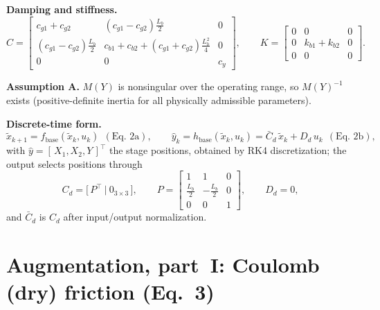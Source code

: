 \documentclass[11pt]{article}
\newcommand{\xb}{\tilde{x}}
\newcommand{\yh}{\hat{y}}
\newcommand{\Cbar}{\bar{C}_d}
\newcommand{\fb}{f_{\mathrm{base}}}
\newcommand{\hb}{h_{\mathrm{base}}}
\begin{document}
\medskip\noindent\textbf{Damping and stiffness.}
\begin{equation}
  C =
  \begin{bmatrix}
    c_{g1}{+}c_{g2}             & (c_{g1}{-}c_{g2})\tfrac{L_b}{2}                    & 0 \\[2mm]
    (c_{g1}{-}c_{g2})\tfrac{L_b}{2} & c_{b1}{+}c_{b2}{+}(c_{g1}{+}c_{g2})\tfrac{L_b^2}{4} & 0 \\[2mm]
    0                          & 0                                                  & c_y
  \end{bmatrix},
  \qquad
  K =
  \begin{bmatrix}
    0 & 0            & 0 \\[2mm]
    0 & k_{b1}{+}k_{b2} & 0 \\[2mm]
    0 & 0            & 0
  \end{bmatrix}.
  \label{eq:baseline-CK}
\end{equation}

\medskip\noindent\textbf{Assumption A.}\quad
$M(Y)$ is nonsingular over the operating range, so $M(Y)^{-1}$ exists (positive-definite
inertia for all physically admissible parameters).

\medskip\noindent\textbf{Discrete-time form.}
\begin{equation}
  \xb_{k+1} = \fb(\xb_k, u_k)\ \ (\text{Eq.\ 2a}) , \qquad
  \yh_k = \hb(\xb_k, u_k) = \Cbar\,\xb_k + D_d\,u_k\ \ (\text{Eq.\ 2b}) ,
  \label{eq:baseline-io}
\end{equation}
with $\yh = [\,X_1,X_2,Y\,]^\top$ the stage positions, obtained by RK4 discretization; the
output selects positions through
\begin{equation}
  C_d = \big[\, P^\top \ \big|\ 0_{3\times3} \,\big] , \qquad
  P =
  \begin{bmatrix}
    1 & 1 & 0 \\
    \tfrac{L_b}{2} & -\tfrac{L_b}{2} & 0 \\
    0 & 0 & 1
  \end{bmatrix} , \qquad
  D_d = 0 ,
  \label{eq:baseline-out}
\end{equation}
and $\Cbar$ is $C_d$ after input/output normalization.

\section{Augmentation, part~I: Coulomb (dry) friction \quad (Eq.~3)}
\end{document}

